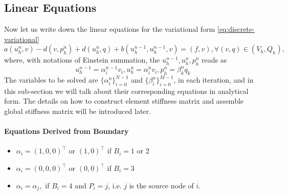 \subsection{Linear Equations}
Now let us write down the linear equations for the variational form \eqref{eq:discrete-variational}
\[
  a(u_h^n,v)-d(v,p^n_h)+d(u_h^n,q)+b(u_h^{n-1},u_h^{n-1},v)=(f,v),\forall (v,q)\in(V_h,Q_h),
  \]
where, with notations of Einstein summation, the $u_h^{n-1},u_h^n,p_h^n$ reads as
\begin{equation}\label{eq:uf-linear-approximation}
  u_h^{n-1}=\alpha_i^{n-1}v_i,u_h^n=\alpha_i^nv_i,p_h^n=\beta_k^nq_k
\end{equation}
The variables to be solved are $\{\alpha_i^n\}_{i=0}^{N-1}$ and $\{\beta_i^n\}_{i=0}^{M-1}$, in each iteration, 
and in this sub-section we will talk about their corresponding equations in analytical form.
The details on how to construct element stiffness matrix and assemble global stiffness matrix 
will be introduced later.

\paragraph{Equations Derived from Boundary}
\begin{itemize}
  \item $\alpha_i=(1,0,0)^\top \text{ or } (1,0)^\top$ if $B_i=1$ or $2$
  \item $\alpha_i=(0,0,0)^\top \text{ or } (0,0)^\top$ if $B_i=3$
  \item $\alpha_i=\alpha_j,$ if $B_i=4$ and $P_i=j$, i.e. $j$ is the source node of $i$.
\end{itemize}


